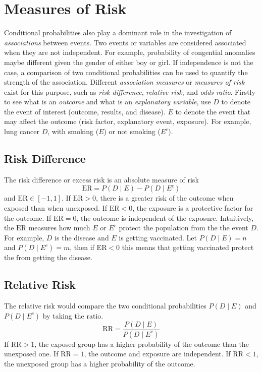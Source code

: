 \section{Measures of Risk}
Conditional probabilities also play a dominant role in the investigation of \emph{associations} between events. Two events or variables are considered associated when they are not independent. For example, probability of congential anomalies maybe 
different given the gender of either boy or girl. If independence is not the case, a comparison of two conditional probabilities can be used to quantify the strength of the association. Different \emph{association measures} or \emph{measures of risk} 
exist for this purpose, such as \emph{risk difference}, \emph{relative risk}, and \emph{odds ratio}. Firstly to see what is an \emph{outcome} and what is an \emph{explanatory variable}, use $D$ to denote the event of interest (outcome, results, and
disease). $E$ to denote the event that may affect the outcome (risk factor, explanatory event, exposure). For example, lung cancer $D$, with smoking ($E$) or not smoking ($E^c$).

\subsection{Risk Difference}
The risk difference or excess risk is an absolute measure of risk
\begin{equation}\label{eq:RiskDifference}
    \mathrm{ER}=P(D\mid E)-P(D\mid E^c)
\end{equation}
and $\mathrm{ER}\in[-1,1]$. If $\mathrm{ER}>0$, there is a greater risk of the outcome when exposed than when unexposed. If $\mathrm{ER}<0$, the exposure is a protective factor for the outcome. If $\mathrm{ER}=0$, the outcome is independent of 
the exposure. Intuitively, the $\mathrm{ER}$ measures how much $E$ or $E^c$ protect the population from the the event $D$. For example, $D$ is the disease and $E$ is getting vaccinated. Let $P(D\mid E)=n$ and $P(D\mid E^c)=m$, then if 
$\mathrm{ER}<0$ this means that getting vaccinated protect the from getting the disease.

\subsection{Relative Risk}
The relative risk would compare the two conditional probabilities $P(D\mid E)$ and $P(D\mid E^c)$ by taking the ratio. 
\begin{equation}\label{eq:RelativeRisk}
    \mathrm{RR}=\frac{P(D\mid E)}{P(D\mid E^c)}
\end{equation}
If $\mathrm{RR}>1$, the exposed group has a higher probability of the outcome than the unexposed one. If $\mathrm{RR}=1$, the outcome and exposure are independent. If $\mathrm{RR}<1$, the unexposed group has a higher probability of the outcome.

